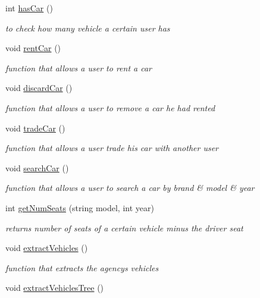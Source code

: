 \begin{Indent}
\begin{DoxyCompactItemize}
int \hyperlink{group___agency_ga7b37fecbc7cf1524b841ac82be7a7d29}{has\+Car} ()
\begin{DoxyCompactList}\small\item\em to check how many vehicle a certain user has \end{DoxyCompactList}\item 
void \hyperlink{group___agency_gab797bb2fa8351c1a5d1946e5be796df7}{rent\+Car} ()
\begin{DoxyCompactList}\small\item\em function that allows a user to rent a car \end{DoxyCompactList}\item 
void \hyperlink{group___agency_gade564b2cc678fce19a24db37ba3ad956}{discard\+Car} ()
\begin{DoxyCompactList}\small\item\em function that allows a user to remove a car he had rented \end{DoxyCompactList}\item 
void \hyperlink{group___agency_ga1f58c5179d80187fc0b53a6da93dee90}{trade\+Car} ()
\begin{DoxyCompactList}\small\item\em function that allows a user trade his car with another user \end{DoxyCompactList}\item 
void \hyperlink{group___agency_gaae7bafe5a3a5231ace9a73b9835c4c79}{search\+Car} ()
\begin{DoxyCompactList}\small\item\em function that allows a user to search a car by brand \& model \& year \end{DoxyCompactList}\item 
int \hyperlink{group___agency_ga55fd7b63ca65ffdb6dfe8694301af29c}{get\+Num\+Seats} (string model, int year)
\begin{DoxyCompactList}\small\item\em returns number of seats of a certain vehicle minus the driver seat \end{DoxyCompactList}\item 
void \hyperlink{group___agency_gaa9a66ffb449986839a0089fc7239ac54}{extract\+Vehicles} ()
\begin{DoxyCompactList}\small\item\em function that extracts the agency\textquotesingle{}s vehicles \end{DoxyCompactList}\item 
void \hyperlink{group___agency_gaa88930db176fb321347b28e279699d4f}{extract\+Vehicles\+Tree} ()

\end{DoxyCompactItemize}
\end{Indent}
